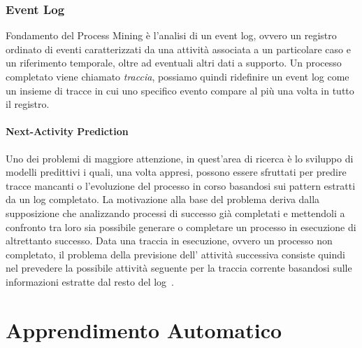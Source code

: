\documentclass[12pt,a4paper]{report}
\begin{document}
    \subsection{Event Log}
    Fondamento del Process Mining \`e l'analisi di un
    event log, ovvero un registro ordinato di eventi
    caratterizzati da una attivit\`a associata a un
    particolare caso e un riferimento temporale, oltre ad
    eventuali altri dati a supporto. Un processo
    completato viene chiamato \textit{traccia}, possiamo
    quindi ridefinire un event log come un insieme di
    tracce in cui uno specifico evento compare al pi\`u
    una volta in tutto il registro.

    \subsubsection{Next-Activity Prediction}
    Uno dei problemi di maggiore attenzione, in quest'area
    di ricerca \`e lo sviluppo di modelli predittivi i
    quali, una volta appresi, possono essere sfruttati
    per predire tracce mancanti o l'evoluzione del processo
    in corso basandosi sui pattern estratti da un log 
    completato. La motivazione alla base del problema deriva dalla
    supposizione che analizzando processi di successo 
    gi\`a completati e mettendoli a confronto tra loro
    sia possibile generare o completare un processo in
    esecuzione di altrettanto successo. 
    Data una traccia in esecuzione, ovvero un processo
    non completato, il problema della previsione dell' attivit\`a 
    successiva consiste quindi nel prevedere la
    possibile attivit\`a seguente per la traccia corrente
    basandosi sulle informazioni estratte dal resto del 
    log~\cite{10.1007/978-3-642-28108-2_19}.

    \chapter{Apprendimento Automatico}
\end{document}
